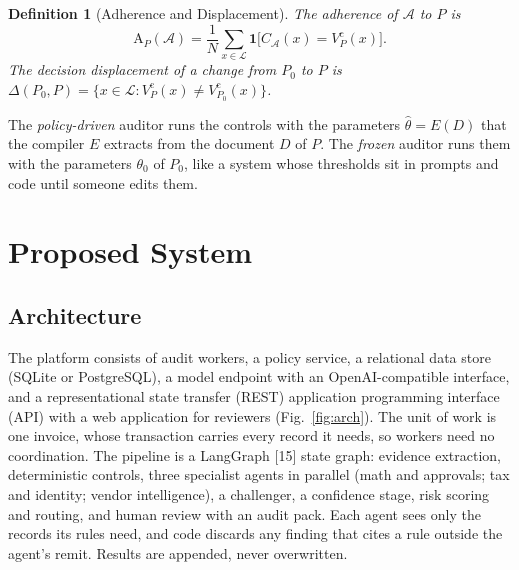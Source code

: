 \documentclass[9pt,a4paper,twocolumn]{extarticle}
\newtheorem{definition}{Definition}
\newcommand{\Vc}{V^{\mathrm{c}}}
\newcommand{\rp}{\hat{\theta}}
\begin{document}
\begin{definition}[Adherence and Displacement]
The adherence of $\mathcal{A}$ to $P$ is
\begin{equation}
\mathrm{A}_P(\mathcal{A})=\frac{1}{N}\sum_{x\in\mathcal{L}}\mathbf{1}\bigl[C_{\mathcal{A}}(x)=\Vc_P(x)\bigr].
\label{eq:adherence}
\end{equation}
The decision displacement of a change from $P_0$ to $P$ is $\Delta(P_0,P)=\{x\in\mathcal{L}:\Vc_P(x)\neq\Vc_{P_0}(x)\}$.
\end{definition}

The \emph{policy-driven} auditor runs the controls with the parameters $\rp=E(D)$ that the compiler $E$ extracts from the document $D$ of $P$. The \emph{frozen} auditor runs them with the parameters $\theta_0$ of $P_0$, like a system whose thresholds sit in prompts and code until someone edits them.

\section{Proposed System}
\label{sec:system}
\subsection{Architecture}
The platform consists of audit workers, a policy service, a relational data store (SQLite or PostgreSQL), a model endpoint with an OpenAI-compatible interface, and a representational state transfer (REST) application programming interface (API) with a web application for reviewers (Fig.~\ref{fig:arch}). The unit of work is one invoice, whose transaction carries every record it needs, so workers need no coordination. The pipeline is a LangGraph [15] state graph: evidence extraction, deterministic controls, three specialist agents in parallel (math and approvals; tax and identity; vendor intelligence), a challenger, a confidence stage, risk scoring and routing, and human review with an audit pack. Each agent sees only the records its rules need, and code discards any finding that cites a rule outside the agent's remit. Results are appended, never overwritten.
\end{document}
